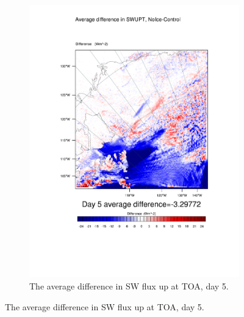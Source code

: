 \begin{figure}
\begin{subfigure}{0.48\textwidth}
		\includegraphics[width=\textwidth]{results/noice/diff_NoIce_SWUPT_Day5.pdf}
		\caption{The average difference in SW flux up at TOA, day 5.}
		\label{subfig:swup_r2Day5}
	\end{subfigure}
	

\end{figure}
